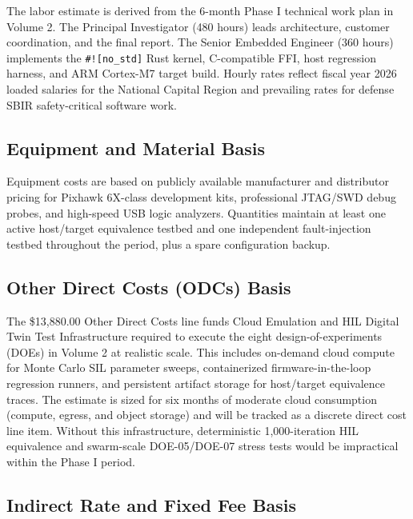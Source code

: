 \documentclass[10pt]{article}
\begin{document}
The labor estimate is derived from the 6-month Phase I technical work plan in Volume 2. The Principal Investigator (480 hours) leads architecture, customer coordination, and the final report. The Senior Embedded Engineer (360 hours) implements the \texttt{\#![no\_std]} Rust kernel, C-compatible FFI, host regression harness, and ARM Cortex-M7 target build. Hourly rates reflect fiscal year 2026 loaded salaries for the National Capital Region and prevailing rates for defense SBIR safety-critical software work.

\subsection{Equipment and Material Basis}

Equipment costs are based on publicly available manufacturer and distributor pricing for Pixhawk 6X-class development kits, professional JTAG/SWD debug probes, and high-speed USB logic analyzers. Quantities maintain at least one active host/target equivalence testbed and one independent fault-injection testbed throughout the period, plus a spare configuration backup.

\subsection{Other Direct Costs (ODCs) Basis}

The \$13,880.00 Other Direct Costs line funds Cloud Emulation and HIL Digital Twin Test Infrastructure required to execute the eight design-of-experiments (DOEs) in Volume 2 at realistic scale. This includes on-demand cloud compute for Monte Carlo SIL parameter sweeps, containerized firmware-in-the-loop regression runners, and persistent artifact storage for host/target equivalence traces. The estimate is sized for six months of moderate cloud consumption (compute, egress, and object storage) and will be tracked as a discrete direct cost line item. Without this infrastructure, deterministic 1,000-iteration HIL equivalence and swarm-scale DOE-05/DOE-07 stress tests would be impractical within the Phase I period.

\subsection{Indirect Rate and Fixed Fee Basis}
\end{document}
